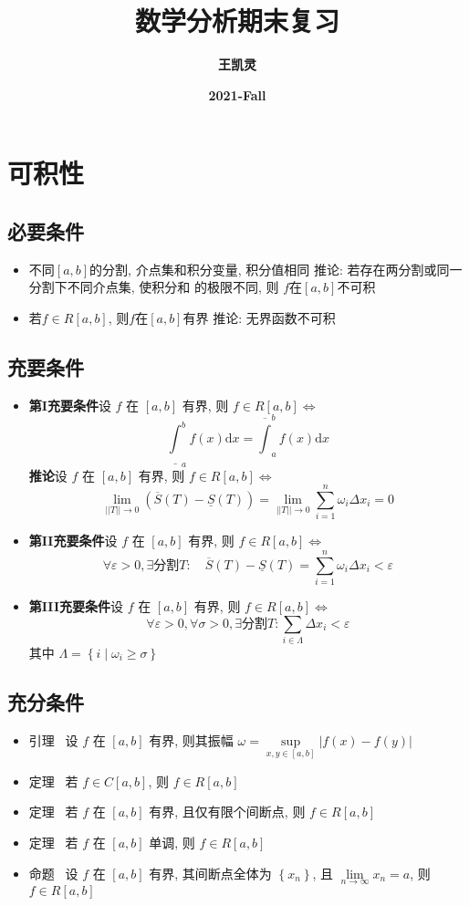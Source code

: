 \documentclass{article}
\title{\textbf{
		\zihao{2}数学分析期末复习}}
\author{\textbf{王凯灵}}
\date{\textbf{2021-Fall}}
\begin{document}
	\maketitle
	\tableofcontents
	\newpage
	\section{可积性}
		\subsection{必要条件}
		\begin{itemize}
			\item 不同$[a, b]$的分割, 介点集和积分变量, 积分值相同
			\subitem 推论: 若存在两分割或同一分割下不同介点集, 使积分和
			的极限不同, 则 $f$在$[a, b]$不可积
			\item 若$f\in R[a, b]$, 则$f$在$[a, b]$有界
			\subitem 推论: 无界函数不可积
		\end{itemize}
		\subsection{充要条件}
		\begin{itemize}
			\item \textbf{第I充要条件}设 $f$ 在 $[a, b]$ 有界, 则 $f \in R[a, b] \Leftrightarrow$
			$$
			\underline\int_{a}^{b} f(x) \mathrm{d} x=\overline\int_{a}^{b} f(x) \mathrm{d} x
			$$
			\textbf{推论}设 $f$ 在 $[a, b]$ 有界, 则 $f \in R[a, b] \Leftrightarrow$
			$$
			\lim _{||T|| \rightarrow 0}(\overline{S}(T)-\underline{S}(T))=\lim _{||T|| \rightarrow 0} \sum_{i=1}^{n} \omega_{i} \Delta x_{i}=0
			$$
			\item \textbf{第II充要条件}设 $f$ 在 $[a, b]$ 有界, 则 $f \in R[a, b] \Leftrightarrow$
			$$
			\forall \varepsilon>0, \exists\text{分割}T: \quad \overline{S}(T)-\underline{S}(T)=\sum_{i=1}^{n} \omega_{i} \Delta x_{i}<\varepsilon
			$$
			\item \textbf{第III充要条件}设 $f$ 在 $[a, b]$ 有界, 则 $f \in R[a, b] \Leftrightarrow$
			$$
			\forall \varepsilon>0, \forall \sigma>0, \exists \text{分割} T: \sum_{i \in \Lambda} \Delta x_{i}<\varepsilon
			$$
			其中 $\Lambda=\left\{i \mid \omega_{i} \geq \sigma\right\}$
		\end{itemize}
		\subsection{充分条件}
		\begin{itemize}
			\item 引理 ~设 $f$ 在 $[a, b]$ 有界, 则其振幅 $\omega=\underset{x, y \in[a, b]}{\sup}|f(x)-f(y)|$
			\item 定理 ~若 $f \in C[a, b]$, 则 $f \in R[a, b]$
			\item 定理 ~若 $f$ 在 $[a, b]$ 有界, 且仅有限个间断点, 则 $f \in R[a, b]$
			\item 定理 ~若 $f$ 在 $[a, b]$ 单调, 则 $f \in R[a, b]$
			\item 命题 ~设 $f$ 在 $[a, b]$ 有界, 其间断点全体为 $\left\{x_{n}\right\}$, 且 $\underset{n \rightarrow \infty}{\lim} x_{n}=a$, 则 $f \in R[a, b]$
		\end{itemize}
		\newpage
\end{document}

